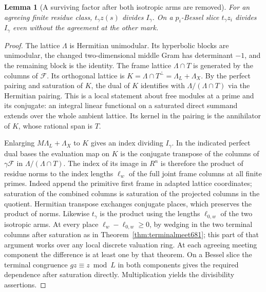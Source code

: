 \documentclass[a4paper,11pt]{article}
\newtheorem{lemma}[proposition]{Lemma}
\theoremstyle{definition}
\theoremstyle{remark}
\numberwithin{equation}{section}
\begin{document}
\begin{lemma}[A surviving factor after both isotropic arms are removed]
\leavevmode\label{lem:augmentedindex687}
For an agreeing finite residue class, \(t_\gamma z(s)\) divides
\(I_\gamma\). On a \(p_i\)-Bessel slice \(t_\gamma z_i\) divides
\(I_\gamma\) even without the agreement at the other mark.
\end{lemma}
\begin{proof}
The lattice \(\Lambda\) is Hermitian unimodular. Its hyperbolic
blocks are unimodular, the changed two-dimensional middle
Gram has determinant \(-1\), and the remaining block is the
identity. The frame lattice \(\Lambda\cap T\) is generated by
the columns of \(\mathcal F\). Its orthogonal lattice is
\(K=\Lambda\cap T^\perp=\Lambda_L+\Lambda_X\).
By the perfect pairing and saturation of \(K\), the dual of
\(K\) identifies with \(\Lambda/(\Lambda\cap T)\) via the
Hermitian pairing. This is a local statement about free
modules at a prime and its conjugate: an integral linear
functional on a saturated direct summand extends over the
whole ambient lattice. Its kernel in the pairing is the
annihilator of \(K\), whose rational span is \(T\).

Enlarging \(M\Lambda_L+\Lambda_X\) to \(K\) gives an index
dividing \(I_\gamma\). In the indicated perfect dual bases
the evaluation map on \(K\) is the conjugate transpose of
the columns of \(\gamma\mathcal F\) in
\(\Lambda/(\Lambda\cap T)\). The index of its image in \(R^n\)
is therefore the product of residue norms to the index lengths
\(\ell_w\) of the full joint frame columns at all finite primes.
Indeed append the primitive first frame in adapted lattice
coordinates; saturation of the combined columns is saturation
of the projected columns in the quotient. Hermitian transpose
exchanges conjugate places, which preserves the product of
norms. Likewise \(t_\gamma\) is the product using the lengths
\(\ell_{0,w}\) of the two isotropic arms. At every place
\(\ell_w-\ell_{0,w}\ge0\), by wedging in the two terminal
columns after saturation as in Theorem~\ref{thm:terminalmeet681};
this part of that argument works over any local discrete
valuation ring. At each agreeing meeting component the
difference is at least one by that theorem. On a Bessel slice
the terminal congruence \(g z\equiv z\bmod L\) in both
components gives the required dependence after saturation
directly. Multiplication yields the divisibility assertions.
\end{proof}
\end{document}
